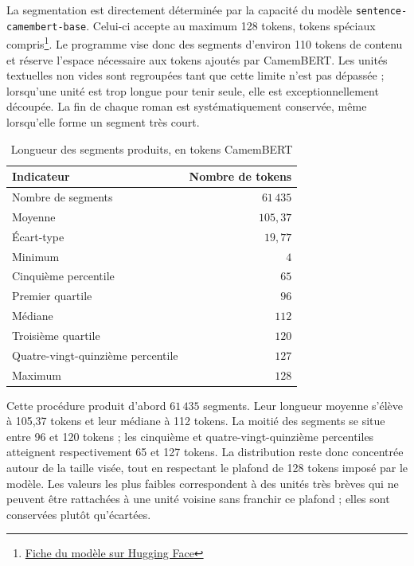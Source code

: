 La segmentation est directement déterminée par la capacité du modèle \texttt{sentence-\allowbreak camembert-\allowbreak base}. Celui-ci accepte au maximum 128 tokens, tokens spéciaux compris\footnote{\href{https://huggingface.co/dangvantuan/sentence-camembert-base} {Fiche du modèle sur Hugging Face}}. Le programme vise donc des segments d'environ 110 tokens de contenu et réserve l'espace nécessaire aux tokens ajoutés par CamemBERT. Les unités textuelles non vides sont regroupées tant que cette limite n'est pas dépassée ; lorsqu'une unité est trop longue pour tenir seule, elle est exceptionnellement découpée. La fin de chaque roman est systématiquement conservée, même lorsqu'elle forme un segment très court.

\begin{table}[htbp]
    \centering
    \caption{Longueur des segments produits, en tokens CamemBERT}
    \label{tab:stat_phrases_paquet}
    \begin{tabular}{lr}
        \toprule
        \textbf{Indicateur} & \textbf{Nombre de tokens} \\
        \midrule
        Nombre de segments       & \(61\,435\) \\
        Moyenne                  & \(105{,}37\) \\
        Écart-type               & \(19{,}77\) \\
        Minimum                  & \(4\) \\
        Cinquième percentile     & \(65\) \\
        Premier quartile         & \(96\) \\
        Médiane                  & \(112\) \\
        Troisième quartile       & \(120\) \\
        Quatre-vingt-quinzième percentile & \(127\) \\
        Maximum                  & \(128\) \\
        \bottomrule
    \end{tabular}
\end{table}

Cette procédure produit d'abord \(61\,435\) segments. Leur longueur moyenne s'élève à 105,37 tokens et leur médiane à 112 tokens. La moitié des segments se situe entre 96 et 120 tokens ; les cinquième et quatre-vingt-quinzième percentiles atteignent respectivement 65 et 127 tokens. La distribution reste donc concentrée autour de la taille visée, tout en respectant le plafond de 128 tokens imposé par le modèle. Les valeurs les plus faibles correspondent à des unités très brèves qui ne peuvent être rattachées à une unité voisine sans franchir ce plafond ; elles sont conservées plutôt qu'écartées.

